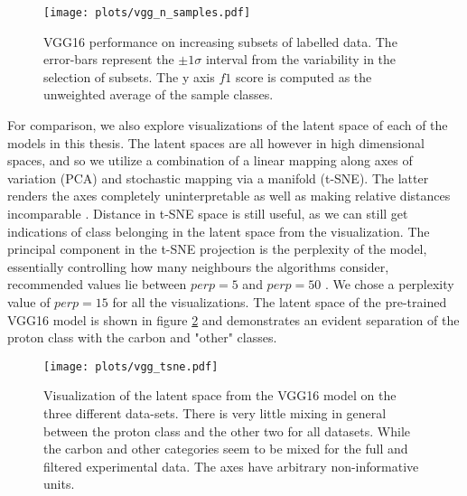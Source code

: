 \begin{figure}
\centering
\texttt{[image: plots/vgg\_n\_samples.pdf]}
\caption[VGG16 performance on labelled subsets]{VGG16 performance on increasing subsets of labelled data. The error-bars represent the $\pm 1\sigma$ interval from the variability in the selection of subsets. The y axis $f1$ score is computed as the unweighted average of the sample classes. }\label{fig:vgg_n_samples}
\end{figure}

For comparison, we also explore visualizations of the latent space of each of the models in this thesis. The latent spaces are all however in high dimensional spaces, and so we utilize a combination of a linear mapping along axes of variation (PCA) and stochastic mapping via a manifold (t-SNE). The latter renders the axes completely uninterpretable as well as making relative distances incomparable \cite{VanDerMaaten2008}. Distance in t-SNE space is still useful, as we can still get indications of class belonging in the latent space from the visualization. The principal component in the t-SNE projection is the perplexity of the model, essentially controlling how many neighbours the algorithms consider, recommended values lie between $perp=5$ and $perp=50$ \cite{VanDerMaaten2008}. We chose a perplexity value of $perp=15$ for all the visualizations. The latent space of the pre-trained VGG16 model is shown in figure \ref{fig:vgg_tsne} and demonstrates an evident separation of the proton class with the carbon and "other" classes. 

\begin{figure}
\centering
\texttt{[image: plots/vgg\_tsne.pdf]}
\caption[VGG16 latent visualization]{Visualization of the latent space from the VGG16 model on the three different data-sets. There is very little mixing in general between the proton class and the other two for all datasets. While the carbon and other categories seem to be mixed for the full and filtered experimental data. The axes have arbitrary non-informative units.}\label{fig:vgg_tsne}
\end{figure}